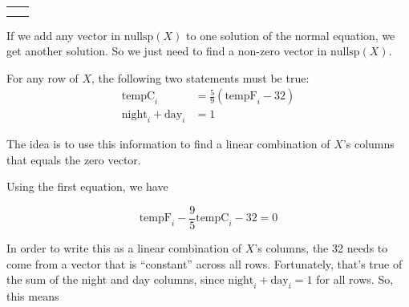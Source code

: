 \documentclass[11pt]{article}
\begin{document}
\begin{prob}[(20 pts)]
\begin{subprob}
\begin{tabular}{ll}
\bubble{$\left \{ \vec w' + t\begin{bmatrix} 1 \\ -9/5 \\ 32 \\ -32 \end{bmatrix}, \: t \in \mathbb{R} \right\}$} &
\correctbubble{$\left \{ \vec w' + t\begin{bmatrix} 1 \\ -9/5 \\ -32 \\ -32 \end{bmatrix}, \: t \in \mathbb{R} \right\}$} \\[2em]
\bubble{$\left \{ \vec w' + t\begin{bmatrix} 1 \\ 9/5 \\ 32 \\ -32 \end{bmatrix}, \: t \in \mathbb{R} \right\}$} &
\bubble{$\left \{ \vec w' + t\begin{bmatrix} 1 \\ 9/5 \\ 32 \\ -32 \end{bmatrix}, \: t \in \mathbb{R} \right\}$}
\end{tabular}

\begin{solution}
If we add any vector in $\text{nullsp}(X)$ to one solution of the normal equation, we get another solution. So we just need to find a non-zero vector in $\text{nullsp}(X)$.

For any row of $X$, the following two statements must be true:
\begin{align*}
    \text{tempC}_i &= \frac{5}{9}(\text{tempF}_i - 32) \\
    \text{night}_i + \text{day}_i &= 1
\end{align*}

The idea is to use this information to find a linear combination of $X$'s columns that equals the zero vector.

Using the first equation, we have

$$\text{tempF}_i - \frac{9}{5}\text{tempC}_i - 32 = 0$$

In order to write this as a linear combination of $X$'s columns, the 32 needs to come from a vector that is ``constant'' across all rows. Fortunately, that's true of the sum of the night and day columns, since $\text{night}_i + \text{day}_i = 1$ for all rows. So, this means


\end{solution}
\end{subprob}
\end{prob}
\end{document}
